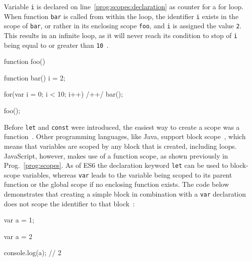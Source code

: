 \begin{program}[h]
\caption{Variable \texttt{i} is declared on line~\ref{prog:scopes:declaration} as counter for a for loop. When function \texttt{bar} is called from within the loop, the identifier \texttt{i} exists in the scope of \texttt{bar}, or rather in its enclosing scope \texttt{foo}, and \texttt{i} is assigned the value \texttt{2}. This results in an infinite loop, as it will never reach its condition to stop of \texttt{i} being equal to or greater than \texttt{10}~\cite[p.~26]{YDKJS:ScopesAndClosures:Simpson:2014}.}
\label{prog:scopes}
\begin{JsCode}
function foo() {

  function bar() {
    i = 2;
  }
  
  for(var i = 0; i < 10; i++) { /+\label{prog:scopes:declaration}+/
    bar();
  }
  
}

foo();
\end{JsCode}
\end{program}

\noindent
Before \texttt{let} and \texttt{const} were introduced, the easiest way to create a scope was a function~\cite[p.~7]{YDKJS:ES6AndBeyond:Simpson:2015}. Other programming languages, like Java, support block scope~\cite[p.~7]{YDKJS:ScopesAndClosures:Simpson:2014}, which means that variables are scoped by any block that is created, including loops. JavaScript, however, makes use of a function scope, as shown previously in Prog.~\ref{prog:scopes}. As of ES6 the declaration keyword \texttt{let} can be used to block-scope variables, whereas \texttt{var} leads to the variable being scoped to its parent function or the global scope if no enclosing function exists. The code below demonstrates that creating a simple block in combination with a \texttt{var} declaration does not scope the identifier to that block~\cite[p.~8]{YDKJS:ES6AndBeyond:Simpson:2015}:
\begin{JsCode}
var a = 1;

{
  var a = 2
}

console.log(a); // 2
\end{JsCode}


